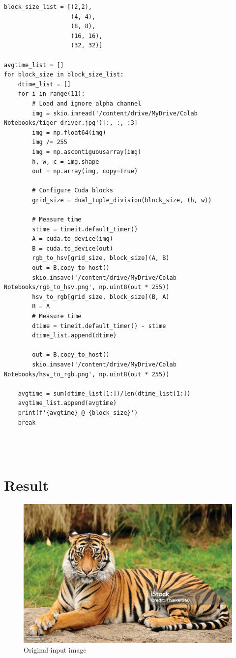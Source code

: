 \documentclass{article}
\begin{document}
\begin{lstlisting}
block_size_list = [(2,2),
                   (4, 4),
                   (8, 8),
                   (16, 16),
                   (32, 32)]

avgtime_list = []
for block_size in block_size_list:
    dtime_list = []
    for i in range(11):
        # Load and ignore alpha channel
        img = skio.imread('/content/drive/MyDrive/Colab Notebooks/tiger_driver.jpg')[:, :, :3]
        img = np.float64(img)
        img /= 255
        img = np.ascontiguousarray(img)
        h, w, c = img.shape
        out = np.array(img, copy=True)

        # Configure Cuda blocks
        grid_size = dual_tuple_division(block_size, (h, w))

        # Measure time
        stime = timeit.default_timer()
        A = cuda.to_device(img)
        B = cuda.to_device(out)
        rgb_to_hsv[grid_size, block_size](A, B)
        out = B.copy_to_host()
        skio.imsave('/content/drive/MyDrive/Colab Notebooks/rgb_to_hsv.png', np.uint8(out * 255))
        hsv_to_rgb[grid_size, block_size](B, A)
        B = A
        # Measure time
        dtime = timeit.default_timer() - stime
        dtime_list.append(dtime)

        out = B.copy_to_host()
        skio.imsave('/content/drive/MyDrive/Colab Notebooks/hsv_to_rgb.png', np.uint8(out * 255))

    avgtime = sum(dtime_list[1:])/len(dtime_list[1:])
    avgtime_list.append(avgtime)
    print(f'{avgtime} @ {block_size}')
    break




\end{lstlisting}
\section*{Result}
\begin{figure}[h]
\begin{center}
   \includegraphics[scale=2]{tiger.jpg}
\end{center}
\caption{Original input image}
\end{figure}
\end{document}
